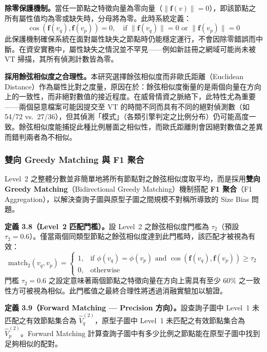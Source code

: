 \begin{ZhChapter}
\textbf{除零保護機制。}當任一節點之特徵向量為零向量（$\|\mathbf{f}(v)\| = 0$），即該節點之所有屬性值均為零或缺失時，分母將為零。此時系統定義：
\begin{equation}
    \cos(\mathbf{f}(v_q), \mathbf{f}(v_p)) = 0, \quad \text{if } \|\mathbf{f}(v_q)\| = 0 \text{ or } \|\mathbf{f}(v_p)\| = 0
    \label{eq:cosine-zero}
\end{equation}
此保護機制確保系統在面對屬性缺失之節點時仍能穩定運行，不會因除零錯誤而中斷。在資安實務中，屬性缺失之情況並不罕見——例如新註冊之網域可能尚未被 VT 掃描，其所有偵測計數皆為零。

\textbf{採用餘弦相似度之合理性。}本研究選擇餘弦相似度而非歐氏距離（Euclidean Distance）作為屬性比對之度量，原因在於：餘弦相似度衡量的是兩個向量在方向上的一致性，而非絕對數值的接近程度。在威脅情資之脈絡下，此特性尤為重要——兩個惡意檔案可能因提交至 VT 的時間不同而具有不同的絕對偵測數（如 54/72 vs.\ 27/36），但其偵測「模式」（各類引擎判定之比例分布）仍可能高度一致。餘弦相似度能捕捉此種比例層面之相似性，而歐氏距離則會因絕對數值之差異而錯判兩者為不相似。


\subsubsection{雙向 Greedy Matching 與 F1 聚合}

Level~2 之整體分數並非簡單地將所有節點對之餘弦相似度取平均，而是採用\textbf{雙向 Greedy Matching}（Bidirectional Greedy Matching）機制搭配 \textbf{F1 聚合}（F1 Aggregation），以解決查詢子圖與原型子圖之間規模不對稱所導致的 Size Bias 問題。

\noindent\textbf{定義 3.8（Level~2 匹配門檻）。}設 Level~2 之餘弦相似度門檻為 $\tau_2$（預設 $\tau_2 = 0.6$）。僅當兩個同類型節點之餘弦相似度達到此門檻時，該匹配才被視為有效：
\begin{equation}
    \text{match}_2(v_q, v_p) = \begin{cases} 1, & \text{if } \phi(v_q) = \phi(v_p) \text{ and } \cos(\mathbf{f}(v_q), \mathbf{f}(v_p)) \geq \tau_2 \\ 0, & \text{otherwise} \end{cases}
    \label{eq:l2-threshold}
\end{equation}
門檻 $\tau_2 = 0.6$ 之設定意味著兩個節點之特徵向量在方向上需具有至少 60\% 之一致性方可被視為相似。此門檻值之最終合理性將透過消融實驗加以驗證。

\noindent\textbf{定義 3.9（Forward Matching — Precision 方向）。}設查詢子圖中 Level~1 未匹配之有效節點集合為 $\hat{V}_q^{(2)}$，原型子圖中 Level~1 未匹配之有效節點集合為 $\hat{V}_p^{(2)}$。Forward Matching 計算查詢子圖中有多少比例之節點能在原型子圖中找到足夠相似的配對。


\end{ZhChapter}
